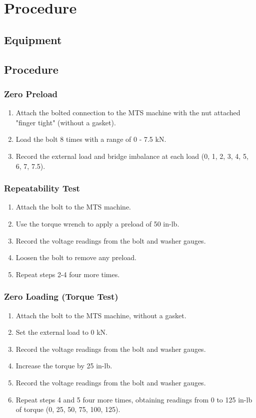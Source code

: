 \section{Procedure}
\label{sec:procedure}

\subsection{Equipment}

\subsection{Procedure}
\subsubsection{Zero Preload}
\begin{enumerate}
    \item Attach the bolted connection to the MTS machine with the nut attached "finger tight" (without a gasket).
    \item Load the bolt 8 times with a range of 0 - 7.5 kN.
    \item Record the external load and bridge imbalance at each load (0, 1, 2, 3, 4, 5, 6, 7, 7.5).
\end{enumerate}
\subsubsection{Repeatability Test}
\begin{enumerate}
    \item Attach the bolt to the MTS machine.
    \item Use the torque wrench to apply a preload of 50 in-lb.
    \item Record the voltage readings from the bolt and washer gauges.
    \item Loosen the bolt to remove any preload.
    \item Repeat steps 2-4 four more times.
\end{enumerate}
\subsubsection{Zero Loading (Torque Test)}
\begin{enumerate}
    \item Attach the bolt to the MTS machine, without a gasket.
    \item Set the external load to 0 kN.
    \item Record the voltage readings from the bolt and washer gauges.
    \item Increase the torque by 25 in-lb.
    \item Record the voltage readings from the bolt and washer gauges.
    \item Repeat steps 4 and 5 four more times, obtaining readings from 0 to 125 in-lb of torque (0, 25, 50, 75, 100, 125).
\end{enumerate}

